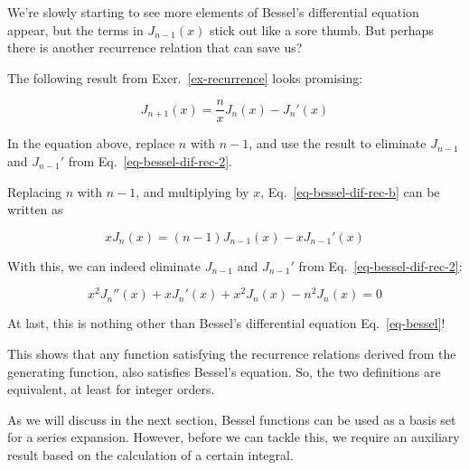 We're slowly starting to see more elements of Bessel's differential equation appear, but the terms in $J_{n-1}(x)$ stick out like a sore thumb. But perhaps there is another recurrence relation that can save us?

The following result from Exer.~\ref{ex-recurrence} looks promising:

\begin{equation}
J_{n+1}(x) = \frac{n}{x}J_n(x) - J_n'(x) \label{eq-bessel-dif-rec-b}
\end{equation} 

\begin{cue}
In the equation above, replace $n$ with $n-1$, and use the result to eliminate $J_{n-1}$ and $J_{n-1}'$ from Eq.~\ref{eq-bessel-dif-rec-2}.
\end{cue}

Replacing $n$ with $n-1$, and multiplying by $x$, Eq.~\ref{eq-bessel-dif-rec-b} can be written as

\begin{equation}
x J_{n}(x) = (n-1)J_{n-1}(x) - x J_{n-1}'(x)
\end{equation} 

With this, we can indeed eliminate $J_{n-1}$ and $J_{n-1}'$ from Eq.~\ref{eq-bessel-dif-rec-2}:

\begin{equation}
x^2 J_n''(x) +  x J_n'(x) + x^2 J_n(x) - n^2 J_n(x) = 0
\end{equation} 

At last, this is nothing other than Bessel's differential equation Eq.~\ref{eq-bessel}!

This shows that any function satisfying the recurrence relations derived from the generating function, also satisfies Bessel's equation. So, the two definitions are equivalent, at least for integer orders.


\pagebreak



As we will discuss in the next section, Bessel functions can be used as a basis set for a series expansion. However, before we can tackle this, we require an auxiliary result based on the calculation of a certain integral.

